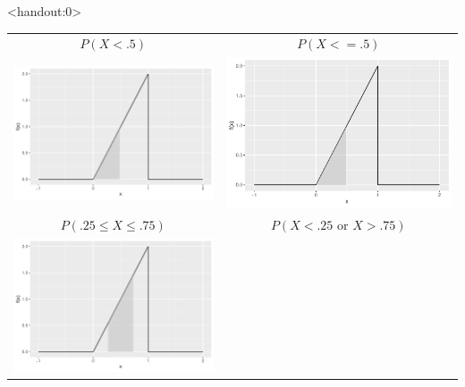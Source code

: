 \begin{frame}<handout:0>
  \begin{block}{\examplectd}
    \begin{tabular}{cc}
      $P(X < .5)$
      & $P(X <=.5)$\\
      \includegraphics[height=.325\textheight]{figure/example-16-3-1}
      & \includegraphics[height=.325\textheight]{figure/example-16-3-2}\\
      $P(.25 \leq X \leq .75)$
      & $P(X<.25 \mbox{ or } X >.75)$\\
      \includegraphics[height=.325\textheight]{figure/example-16-3-3}

\end{tabular}
\end{block}
\end{frame}

